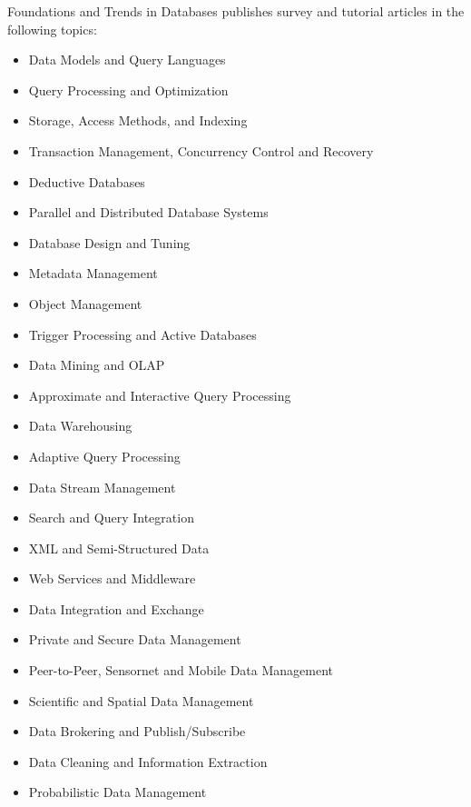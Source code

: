 


\journalaimsandscope
 {%
 Foundations and Trends\textsuperscript{\textregistered} in
Databases publishes
 survey and tutorial articles in the following topics:
 \begin{multicols}{2}\raggedcolumns
 \begin{itemize}
\item{Data Models and Query Languages}
    \item{Query Processing and Optimization}
    \item{Storage, Access Methods, and Indexing}
    \item{Transaction Management, Concurrency Control and Recovery}
    \item{Deductive Databases}
    \item{Parallel and Distributed Database Systems}
    \item{Database Design and Tuning}
    \item{Metadata Management}
    \item{Object Management}
    \item{Trigger Processing and Active Databases}
    \item{Data Mining and OLAP}
    \item{Approximate and Interactive Query Processing}
    \item{Data Warehousing}
    \item{Adaptive Query Processing}
    \item{Data Stream Management}
    \item{Search and Query Integration}
    \item{XML and Semi-Structured Data}
    \item{Web Services and Middleware}
    \item{Data Integration and Exchange}
    \item{Private and Secure Data Management}
    \item{Peer-to-Peer, Sensornet and Mobile Data Management}
    \item{Scientific and Spatial Data Management}
    \item{Data Brokering and Publish/Subscribe}
    \item{Data Cleaning and Information Extraction}
    \item{Probabilistic Data Management}
\end{itemize}
 \end{multicols}
 }



